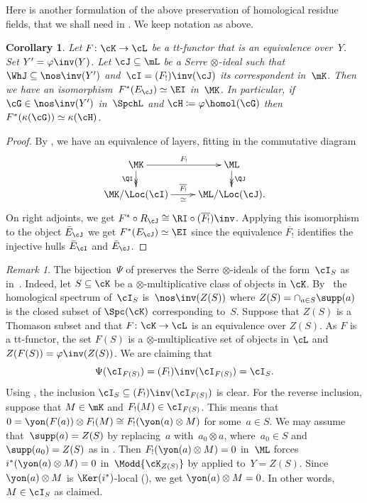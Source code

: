 \documentclass[11pt]{amsart}
\numberwithin{equation}{section} %
\theoremstyle{plain}
\newtheorem{cor}[equation]{Corollary}
\theoremstyle{definition}
\theoremstyle{remark}
\newtheorem{rem}[equation]{Remark}
\begin{document}
Here is another formulation of the above preservation of homological residue fields, that we shall need in . We keep notation as above.

%
\begin{cor}
\label{cor:iso-residue}%
Let $F\colon \cK\to \cL$ be a tt-functor that is an equivalence over~$Y$. Set $Y' = \varphi\inv(Y)$. Let $\cJ\subseteq\mL$ be a Serre $\otimes$-ideal such that $\WhJ\subseteq\nos\inv(Y')$ and~$\cI=(F_!)\inv(\cJ)$ its correspondent in~$\mK$. Then we have an isomorphism~$F^*(E_{\cJ})\simeq \EI$ in~$\MK$. In particular, if $\cG \in \nos \inv(Y')$ in~$\SpchL$ and $\cH \coloneq\varphi\homol(\cG)$ then $F^*(\kappa(\cG))\simeq\kappa(\cH)$.
\end{cor}
\begin{proof}
By , we have an equivalence of layers, fitting in the commutative diagram
%
\[
\xymatrix@R=1.5em{
\MK \ar[r]^-{F_!} \ar@{->>}[d]_-{\QI}
& \ML \ar@{->>}[d]^-{\QJ}
\\
\MK/\Loc(\cI) \ar[r]^-{\overline{F_!}}_-{\simeq}
& \ML/\Loc(\cJ).
}
\]
%
On right adjoints, we get $F^*\circ R_{\cJ}\cong \RI\circ (\overline{F_!})\inv$.
Applying this isomorphism to the object $\bar{E}_{\cJ}$ we get $F^*(E_{\cJ})\simeq \EI$ since the equivalence $\overline{F_!}$ identifies the injective hulls $\bar{E}_{\cI}$ and $\bar{E}_{\cJ}$.
\end{proof}

\begin{rem}
The bijection~$\Psi$ of  preserves the Serre $\otimes$-ideals of the form~$\cI_{S}$ as in~. Indeed, let $S\subseteq \cK$ be a $\otimes$-multiplicative class of objects in $\cK$. By~ the homological spectrum of~$\cI_{S}$ is~$\nos\inv(Z(S))$ where $Z(S)=\cap_{a\in S}\supp(a)$ is the closed subset of $\Spc(\cK)$ corresponding to~$S$. Suppose that $Z(S)$ is a Thomason subset and that $F\colon \cK \to \cL$ is an equivalence over $Z(S)$. As $F$ is a tt-functor, the set $F(S)$ is a $\otimes$-multiplicative set of objects in $\cL$ and $Z(F(S)) = \varphi\inv(Z(S))$. We are claiming that
%
\[
\Psi(\cI_{F(S)})=(F_!)\inv(\cI_{F(S)}) = \cI_S. 
\]
%
Using , the inclusion $\cI_S \subseteq (F_!)\inv (\cI_{F(S)})$ is clear. For the reverse inclusion, suppose that $M \in \mK$ and $F_!(M) \in \cI_{F(S)}$. This means that $0=\yon(F(a))\otimes F_!(M)\cong F_!(\yon(a) \otimes M)$ for some~$a\in S$. We may assume that~$\supp(a) = Z(S)$ by replacing~$a$ with~$a_0\otimes a$, where~$a_0\in S$ and $\supp(a_0)=Z(S)$ as in . Then $F_!(\yon(a) \otimes M) =0$ in~$\ML$ forces $i^*(\yon(a) \otimes M) =0$ in~$\Modd{\cK_{Z(S)}}$ by  applied to~$Y=Z(S)$. Since $\yon(a) \otimes M$ is $\Ker(i^{\ast})$-local (), we get $\yon(a) \otimes M =0$. In other words, $M\in\cI_S$ as claimed.
\end{rem}
\end{document}
